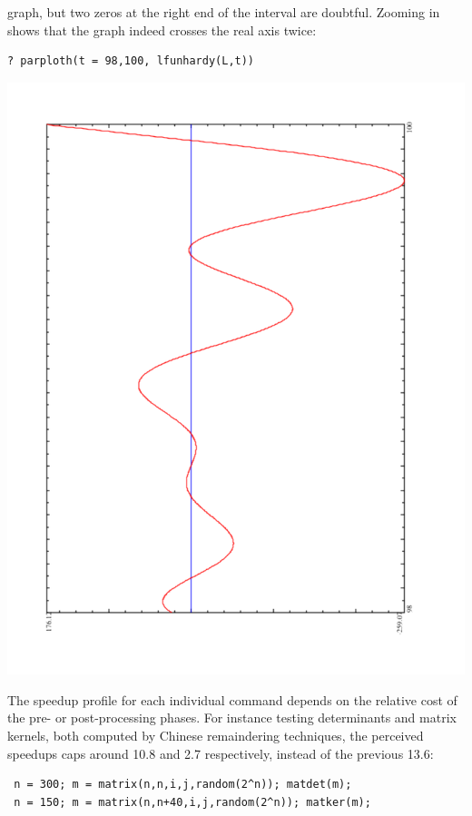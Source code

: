 \documentclass{deliverablereport}
\begin{document}
graph, but two zeros at the right end of the interval are doubtful. Zooming
in shows that the graph indeed crosses the real axis twice:
\begin{verbatim}
? parploth(t = 98,100, lfunhardy(L,t))
\end{verbatim}
\begin{center}
\includegraphics[scale=0.45,angle=-90]{L2.pdf}
\end{center}

The speedup profile for each individual command depends on the relative cost
of the pre- or post-processing phases. For instance testing determinants and
matrix kernels, both computed by Chinese remaindering techniques, the
perceived speedups caps around 10.8 and 2.7 respectively, instead of the
previous 13.6:

\begin{verbatim}
 n = 300; m = matrix(n,n,i,j,random(2^n)); matdet(m);
 n = 150; m = matrix(n,n+40,i,j,random(2^n)); matker(m);
\end{verbatim}
\begin{center}
\end{center}
\end{document}
